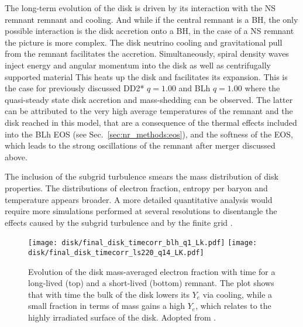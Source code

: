 The long-term evolution of the disk is driven by its interaction with the \ac{NS} remnant 
remnant and cooling. And while if the central remnant is a \ac{BH}, the only possible 
interaction is the disk accretion onto a \ac{BH}, in the case of a \ac{NS} remnant 
the picture is more complex.
%
The disk neutrino cooling and gravitational pull from the remnant facilitates the 
accretion. Simultaneously, spiral density waves inject %
energy and angular momentum into the disk as well as centrifugally supported 
material %
This heats up the disk and 
facilitates its expansion.
This is the case for previously discussed 
DD2* $q=1.00$ and BLh $q=1.00$ where the 
quasi-steady state disk accretion and mass-shedding 
can be observed.
%
%
The latter can be attributed to the 
very high average temperatures of the remnant and the disk reached in this model, that  
are a consequence of the thermal effects included into the BLh \ac{EOS} 
(see Sec.~\ref{sec:nr_methods:eos}), and the softness of the \ac{EOS}, which leads 
to the strong oscillations of the remnant after merger discussed above.

The inclusion of the subgrid turbulence smears the mass distribution of disk 
properties. The distributions of electron fraction, entropy per baryon and 
temperature appears broader. A more detailed quantitative analysis would require more 
simulations performed at several resolutions to disentangle the effects 
caused by the subgrid turbulence and by the finite grid \citep{Bernuzzi:2020txg,Radice:2020ids}.

\begin{figure}[t]
    \centering 
    \texttt{[image: disk/final\_disk\_timecorr\_blh\_q1\_Lk.pdf]}
    \texttt{[image: disk/final\_disk\_timecorr\_ls220\_q14\_LK.pdf]}
    \caption{Evolution of the disk mass-averaged electron fraction with
        time for a long-lived (top) and a short-lived (bottom)
        remnant. The plot shows that with time the bulk of the disk lowers
        its $Y_e$ via cooling, while a small fraction in terms of mass
        gains a high $Y_e$, which relates to the highly 
        irradiated surface of the disk. Adopted from \citet{Nedora:2020pak}.
    }
    \label{fig:total_disk_time_corr_Ye_Blh_q1}
\end{figure}

